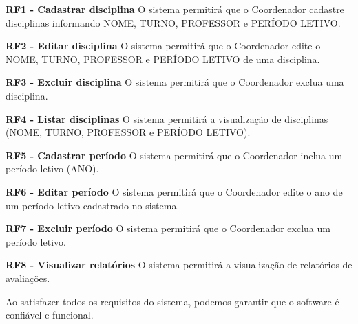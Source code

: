 \begin{alineas}
    \item \textbf{RF1 - Cadastrar disciplina} O sistema permitirá que o Coordenador cadastre disciplinas informando NOME, TURNO, PROFESSOR e PERÍODO LETIVO.
    \item \textbf{RF2 - Editar disciplina} O sistema permitirá que o Coordenador edite o NOME, TURNO, PROFESSOR e PERÍODO LETIVO de uma disciplina.
    \item \textbf{RF3 - Excluir disciplina} O sistema permitirá que o Coordenador exclua uma disciplina.
    \item \textbf{RF4 - Listar disciplinas} O sistema permitirá a visualização de disciplinas (NOME, TURNO, PROFESSOR e PERÍODO LETIVO).
    \item \textbf{RF5 - Cadastrar período} O sistema permitirá que o Coordenador inclua um período letivo (ANO).
    \item \textbf{RF6 - Editar período} O sistema permitirá que o Coordenador edite o ano de um período letivo cadastrado no sistema.
    \item \textbf{RF7 - Excluir período} O sistema permitirá que o Coordenador exclua um período letivo.
    \item \textbf{RF8 - Visualizar relatórios} O sistema permitirá a visualização de relatórios de avaliações.
\end{alineas}

Ao satisfazer todos os requisitos do sistema, podemos garantir que o software é confiável e funcional. 

